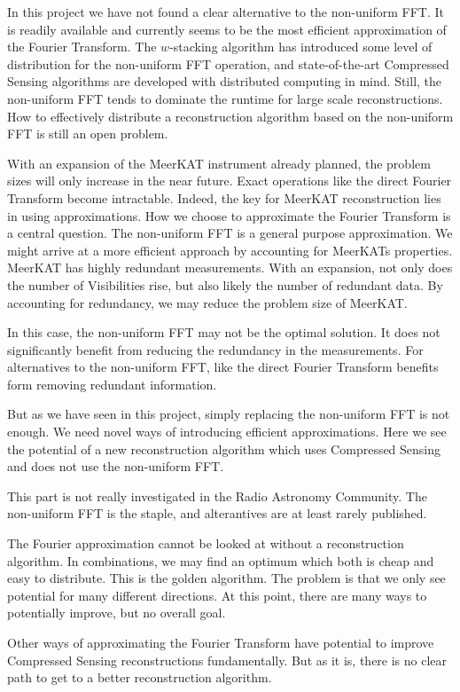 In this project we have not found a clear alternative to the non-uniform FFT. It is readily available and currently seems to be the most efficient approximation of the Fourier Transform. The $w$-stacking algorithm\cite{offringa2014wsclean} has introduced some level of distribution for the non-uniform FFT operation, and state-of-the-art Compressed Sensing algorithms\cite{dabbech2018cygnus, pratley2018fast} are developed with distributed computing in mind. Still, the non-uniform FFT tends to dominate the runtime for large scale reconstructions. How to effectively distribute a reconstruction algorithm based on the non-uniform FFT is still an open problem.

With an expansion of the MeerKAT instrument already planned, the problem sizes will only increase in the near future. Exact operations like the direct Fourier Transform become intractable. Indeed, the key for MeerKAT reconstruction lies in using approximations. How we choose to approximate the Fourier Transform is a central question.  The non-uniform FFT is a general purpose approximation\cite{kunisnonequispaced}. We might arrive at a more efficient approach by accounting for MeerKATs properties. MeerKAT has highly redundant measurements. With an expansion, not only does the number of Visibilities rise, but also likely the number of redundant data. By accounting for redundancy, we may reduce the problem size of MeerKAT.

In this case, the non-uniform FFT may not be the optimal solution. It does not significantly benefit from reducing the redundancy in the measurements.
For alternatives to the non-uniform FFT, like the direct Fourier Transform benefits form removing redundant information. 
 
But as we have seen in this project, simply replacing the non-uniform FFT is not enough. We need novel ways of introducing efficient approximations. Here we see the potential of a new reconstruction algorithm which uses Compressed Sensing and does not use the non-uniform FFT.

This part is not really investigated in the Radio Astronomy Community. The non-uniform FFT is the staple, and alterantives are at least rarely published.

The Fourier approximation cannot be looked at without a reconstruction algorithm. In combinations, we may find an optimum which both is cheap and easy to distribute. This is the golden algorithm. The problem is that we only see potential for many different directions. At this point, there are many ways to potentially improve, but no overall goal.


Other ways of approximating the Fourier Transform have potential to improve Compressed Sensing reconstructions fundamentally. But as it is, there is no clear path to get to a better reconstruction algorithm. 






